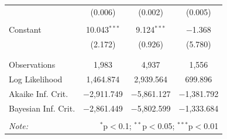 \documentclass[letterpaper,12pt]{article}\usepackage[]{graphicx}\usepackage[]{color}
\begin{document}
\begin{table}[!htbp]
\begin{tabular}{@{\extracolsep{5pt}}lccc}
  & (0.006) & (0.002) & (0.005) \\ 
  & & & \\ 
 Constant & 10.043$^{***}$ & 9.124$^{***}$ & $-$1.368 \\ 
  & (2.172) & (0.926) & (5.780) \\ 
  & & & \\ 
\hline \\[-1.8ex] 
Observations & 1,983 & 4,937 & 1,556 \\ 
Log Likelihood & 1,464.874 & 2,939.564 & 699.896 \\ 
Akaike Inf. Crit. & $-$2,911.749 & $-$5,861.127 & $-$1,381.792 \\ 
Bayesian Inf. Crit. & $-$2,861.449 & $-$5,802.599 & $-$1,333.684 \\ 
\hline 
\hline \\[-1.8ex] 
\textit{Note:}  & \multicolumn{3}{r}{$^{*}$p$<$0.1; $^{**}$p$<$0.05; $^{***}$p$<$0.01} \\ 
\end{tabular} 
\end{table} 

\clearpage
\end{document}
